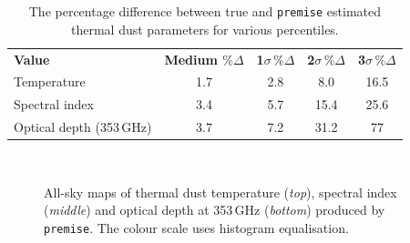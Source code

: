 \documentclass[a4paper,fleqn,usenatbib]{mnras}
\begin{document}
\begin{table}
 \caption{The percentage difference between true and {\texttt{premise}} estimated thermal dust parameters for various percentiles.}
 \label{tab:accstats}
 \begin{tabular}{l| c| c| c| c}
\hline
{\bf{Value}} &{\bf{ Medium $\% \Delta$}}  & {\bf{1$ \sigma \, \% \Delta$}}  & {\bf{2$ \sigma \, \% \Delta$}}  & {\bf{3$ \sigma \, \% \Delta$}}  \\ 
Temperature & 1.7 & 2.8 & 8.0 & 16.5 \\
Spectral index & 3.4 & 5.7 & 15.4 & 25.6 \\
Optical depth (353\,GHz) & 3.7 & 7.2 & 31.2 & 77\\
  \hline
 \end{tabular}
\end{table}

\begin{figure}
\centering
\,
\,
\,
\caption{All-sky maps of thermal dust temperature ({\it{top}}), spectral index ({\it{middle}}) and optical depth at 353\,GHz  ({\it{bottom}}) produced by {\texttt{premise}}. The colour scale uses histogram equalisation.}
\label{fig:dustmaps}
\end{figure}
\end{document}

